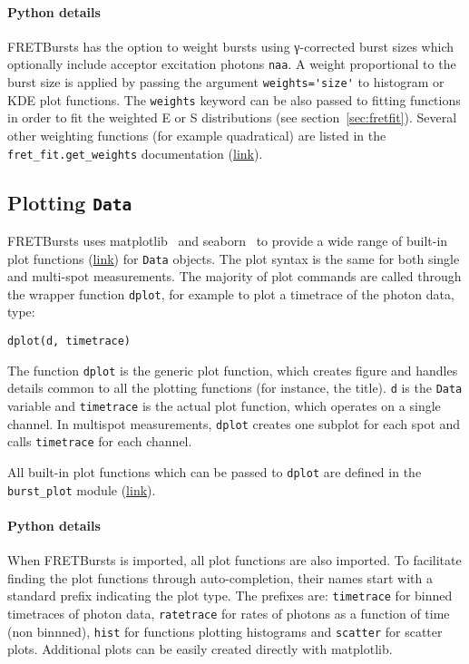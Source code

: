 \paragraph{Python details}
FRETBursts has the option to weight bursts using γ-corrected
burst sizes which optionally include acceptor excitation photons \verb|naa|.
A weight proportional to the burst size is applied by passing the argument
\verb|weights='size'| to histogram or KDE plot functions. The \verb|weights|
keyword can be also passed to fitting functions in order to fit
the weighted E or S distributions (see section~\ref{sec:fretfit}).
Several other weighting functions (for example quadratical) are listed in the
\verb|fret_fit.get_weights| documentation
(\href{http://fretbursts.readthedocs.org/en/latest/fret_fit.html#fretbursts.fret_fit.get_weights}{link}).
\subsection{Plotting \texttt{Data}}
\label{sec:plotting}

FRETBursts uses
matplotlib~\cite{matplotlib}
and seaborn~\cite{seaborn}
to provide a wide range of built-in plot functions
(\href{http://fretbursts.readthedocs.org/en/latest/plots.html}{link})
for \verb|Data| objects.
The plot syntax is the same for both single and multi-spot measurements.
The majority of plot commands are called through the wrapper function
\verb|dplot|, for example to plot a timetrace of the photon data, type:

\begin{lstlisting}
dplot(d, timetrace)
\end{lstlisting}

The function \verb|dplot| is the generic plot function, which creates figure
and handles details common to all the plotting functions (for instance, the title).
\verb|d| is the \verb|Data| variable and \verb|timetrace| is the actual plot
function, which operates on a single channel. In multispot measurements,
\verb|dplot| creates one subplot for each spot and calls \verb|timetrace| for
each channel.

All built-in plot functions which can be passed to
\verb|dplot| are defined in the
\verb|burst_plot| module
(\href{http://fretbursts.readthedocs.org/en/latest/plots.html}{link}).

\paragraph{Python details}
When FRETBursts is imported, all plot functions are also imported.
To facilitate finding the plot functions through auto-completion,
their names start with a standard prefix indicating the
plot type. The prefixes are: \verb|timetrace| for binned timetraces
of photon data, \verb|ratetrace| for rates of photons as a function of time (non
binnned), \verb|hist| for functions plotting histograms and \verb|scatter| for
scatter plots.
Additional plots can be easily created directly with matplotlib.

